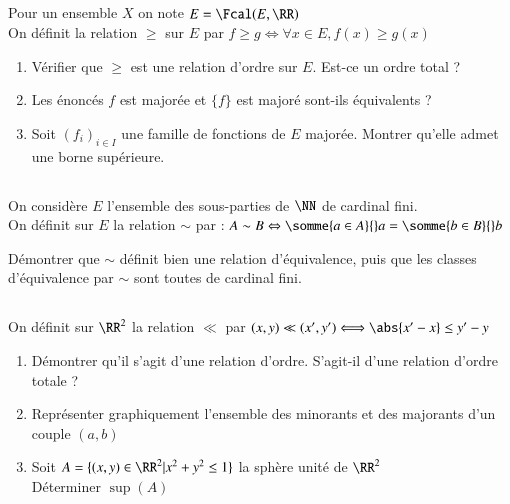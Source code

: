 \documentclass[oneside,12pt]{article}
\begin{document}
\subsection{}
Pour un ensemble $X$ on note $E=\Fcal(E,\RR)$\\
On définit la relation $\geq$ sur $E$ par $f\geq g \Longleftrightarrow \forall x \in E , f(x)\geq g(x)$
\begin{enumerate}
	\item Vérifier que $\geq$ est une relation d'ordre sur $E$. Est-ce un ordre total ?
	\item Les énoncés \og $f$ est majorée \fg{} et \og $\{f\}$ est majoré \fg{} sont-ils équivalents ?
	\item Soit ${(f_i)}_{i\in I}$ une famille de fonctions de $E$ majorée. Montrer qu'elle admet une borne supérieure.
\end{enumerate}


\subsection{}
On considère $E$ l'ensemble des sous-parties de $\NN$ de cardinal fini. \\
On définit sur $E$ la relation $\sim$ par : $A \sim B \Leftrightarrow \somme{a\in A}{}a=\somme{b\in B}{}b$

Démontrer que $\sim$ définit bien une relation d'équivalence, puis que les classes d'équivalence par $\sim$ sont toutes de cardinal fini.

\subsection{}
On définit sur $\RR^2$ la relation $\ll$ par $(x,y)\ll(x',y') \Longleftrightarrow \abs{x'-x} \leq y'-y$
\begin{enumerate}
	\item Démontrer qu'il s'agit d'une relation d'ordre. S'agit-il d'une relation d'ordre totale ?
	\item Représenter graphiquement l'ensemble des minorants et des majorants d'un couple $(a,b)$
	\item Soit $A=\{(x,y)\in\RR^2 | x^2+y^2\leq1\}$ la sphère unité de $\RR^2$ \\
	Déterminer $\sup(A)$
\end{enumerate}
\end{document}
